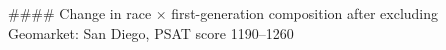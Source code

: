 #### Change in race × first-generation composition after excluding Geomarket: San Diego, PSAT score 1190–1260
